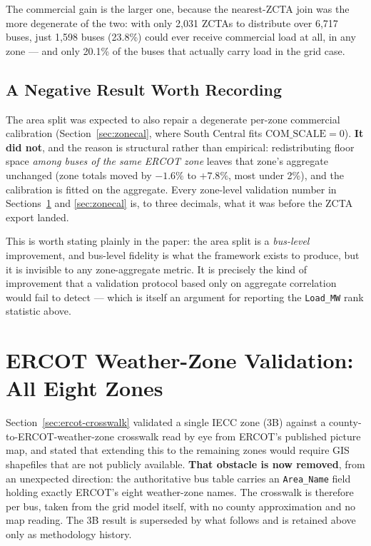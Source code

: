 \documentclass[11pt]{article}
\begin{document}
The commercial gain is the larger one, because the nearest-ZCTA join was the more
degenerate of the two: with only 2{,}031 ZCTAs to distribute over 6{,}717 buses, just
1{,}598 buses (23.8\%) could ever receive commercial load at all, in any zone --- and only
20.1\% of the buses that actually carry load in the grid case.

\subsection{A Negative Result Worth Recording}

The area split was expected to also repair a degenerate per-zone commercial calibration
(Section~\ref{sec:zonecal}, where South Central fits $\mathrm{COM\_SCALE}=0$). \textbf{It
did not}, and the reason is structural rather than empirical: redistributing floor space
\emph{among buses of the same ERCOT zone} leaves that zone's aggregate unchanged (zone
totals moved by $-1.6\%$ to $+7.8\%$, most under 2\%), and the calibration is fitted on
the aggregate. Every zone-level validation number in Sections~\ref{sec:ercot8} and
\ref{sec:zonecal} is, to three decimals, what it was before the ZCTA export landed.

This is worth stating plainly in the paper: the area split is a \emph{bus-level}
improvement, and bus-level fidelity is what the framework exists to produce, but it is
invisible to any zone-aggregate metric. It is precisely the kind of improvement that a
validation protocol based only on aggregate correlation would fail to detect --- which is
itself an argument for reporting the \texttt{Load\_MW} rank statistic above.

\section{ERCOT Weather-Zone Validation: All Eight Zones}
\label{sec:ercot8}

Section~\ref{sec:ercot-crosswalk} validated a single IECC zone (3B) against a
county-to-ERCOT-weather-zone crosswalk read by eye from ERCOT's published picture map,
and stated that extending this to the remaining zones would require GIS shapefiles that
are not publicly available. \textbf{That obstacle is now removed}, from an unexpected
direction: the authoritative bus table carries an \texttt{Area\_Name} field holding
exactly ERCOT's eight weather-zone names. The crosswalk is therefore per bus, taken from
the grid model itself, with no county approximation and no map reading. The 3B result is
superseded by what follows and is retained above only as methodology history.
\end{document}
